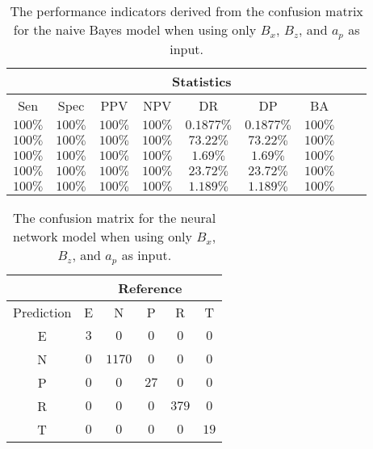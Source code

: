 \begin{table}[!ht]
	\centering
	\begin{tabular}{|c|c|c|c|c|c|c|c|c|}
		\hline
		 & \multicolumn{7}{c|}{Statistics} \\ \hline
		Sen & Spec & PPV & NPV & DR & DP & BA \\ \hline
		$100\%$ & $100\%$ & $100\%$ & $100\%$ & $0.1877\%$ & $0.1877\%$ & $100\%$ \\ \hline
		$100\%$ & $100\%$ & $100\%$ & $100\%$ & $73.22\%$ & $73.22\%$ & $100\%$ \\ \hline
		$100\%$ & $100\%$ & $100\%$ & $100\%$ & $1.69\%$ & $1.69\%$ & $100\%$ \\ \hline
		$100\%$ & $100\%$ & $100\%$ & $100\%$ & $23.72\%$ & $23.72\%$ & $100\%$ \\ \hline
		$100\%$ & $100\%$ & $100\%$ & $100\%$ & $1.189\%$ & $1.189\%$ & $100\%$ \\ \hline
	\end{tabular}
	\caption{The performance indicators derived from the confusion matrix for the naive Bayes model when using only $B_{x}$, $B_{z}$, and $a_{p}$ as input.}
	\label{tab:cs:xzap:nb}
\end{table}

\begin{table}[!ht]
	\centering
	\begin{tabular}{|c|c|c|c|c|c|}
		\hline
		 & \multicolumn{5}{|c|}{Reference} \\ \hline
		 Prediction & E & N & P & R & T \\ \hline
		 E & $3$ & $0$ & $0$ & $0$ & $0$ \\ \hline
		 N & $0$ & $1170$ & $0$ & $0$ & $0$ \\ \hline
		 P & $0$ & $0$ & $27$ & $0$ & $0$ \\ \hline
		 R & $0$ & $0$ & $0$ & $379$ & $0$ \\ \hline
		 T & $0$ & $0$ & $0$ & $0$ & $19$ \\ \hline
	\end{tabular}
	\caption{The confusion matrix for the neural network model when using only $B_{x}$, $B_{z}$, and $a_{p}$ as input.}
	\label{tab:cm:xzap:nnet}
\end{table}

